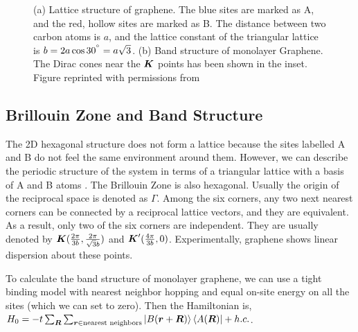 \documentclass{report}
\renewcommand\vec[1]{\ensuremath\boldsymbol{#1}} %
\begin{document}
\begin{figure}[h!]
	\centering
	\caption{(a) Lattice structure of graphene. The blue sites are marked as A, and the red, hollow sites are marked as B. The distance between two carbon atoms is $a$, and the lattice constant of the triangular lattice is $b = 2 a \cos{30^{\degree}} = a\sqrt{3}$. (b) Band structure of monolayer Graphene. The Dirac cones near the $\vec{K}$ points has been shown in the inset. Figure reprinted with permissions from \cite{TheElPropGraphene}}
	\label{fig:GrapheneBandStructure}
\end{figure}

\subsection{Brillouin Zone and Band Structure}
The 2D hexagonal structure does not form a lattice because the sites labelled A and B do not feel the same environment around them. However, we can describe the periodic structure of the system in terms of a triangular lattice with a basis of A and B atoms \cite{book:SimonSolidState}. The Brillouin Zone is also hexagonal. Usually the origin of the reciprocal space is denoted as $\Gamma$. Among the six corners, any two next nearest corners can be connected by a reciprocal lattice vectors, and they are equivalent. As a result, only two of the six corners are independent. They are usually denoted by $\vec{K} (\frac{2\pi}{3b},\frac{2\pi}{\sqrt{3} b})$ and $\vec{K}'(\frac{4\pi}{3b},0)$. Experimentally, graphene shows linear dispersion about these points.

To calculate the band structure of monolayer graphene, we can use a tight binding model with nearest neighbor hopping and equal on-site energy on all the sites (which we can set to zero). Then the Hamiltonian is,
$H_0 = -t \sum_{\vec{R}} \sum_{\vec{r} \in {\text{nearest neighbors}}} \ket{B(\vec{r}+\vec{R})} \bra{A(\vec{R})} + h.c.$.
\end{document}
